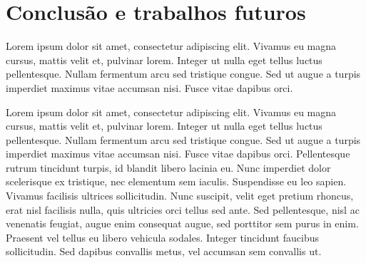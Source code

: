 \chapter{Conclusão e trabalhos futuros}
\label{chap:conclusoes_trabalhos_futuros}

Lorem ipsum dolor sit amet, consectetur adipiscing elit. Vivamus eu magna cursus, mattis velit et, pulvinar lorem. Integer ut nulla eget tellus luctus pellentesque. Nullam fermentum arcu sed tristique congue. Sed ut augue a turpis imperdiet maximus vitae accumsan nisi. Fusce vitae dapibus orci.


Lorem ipsum dolor sit amet, consectetur adipiscing elit. Vivamus eu magna cursus, mattis velit et, pulvinar lorem. Integer ut nulla eget tellus luctus pellentesque. Nullam fermentum arcu sed tristique congue. Sed ut augue a turpis imperdiet maximus vitae accumsan nisi. Fusce vitae dapibus orci. Pellentesque rutrum tincidunt turpis, id blandit libero lacinia eu. Nunc imperdiet dolor scelerisque ex tristique, nec elementum sem iaculis. Suspendisse eu leo sapien. Vivamus facilisis ultrices sollicitudin. Nunc suscipit, velit eget pretium rhoncus, erat nisl facilisis nulla, quis ultricies orci tellus sed ante. Sed pellentesque, nisl ac venenatis feugiat, augue enim consequat augue, sed porttitor sem purus in enim. Praesent vel tellus eu libero vehicula sodales. Integer tincidunt faucibus sollicitudin. Sed dapibus convallis metus, vel accumsan sem convallis ut.


